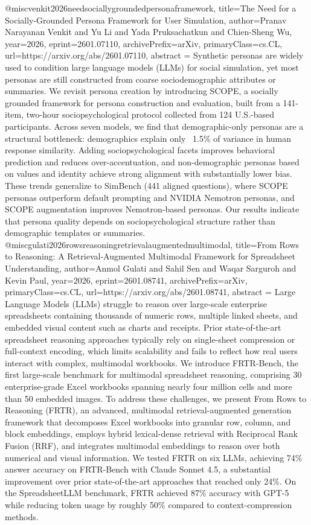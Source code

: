 {}@misc{venkit2026needsociallygroundedpersonaframework,
      title={The Need for a Socially-Grounded Persona Framework for User Simulation}, 
      author={Pranav Narayanan Venkit and Yu Li and Yada Pruksachatkun and Chien-Sheng Wu},
      year={2026},
      eprint={2601.07110},
      archivePrefix={arXiv},
      primaryClass={cs.CL},
      url={https://arxiv.org/abs/2601.07110},
      abstract = {Synthetic personas are widely used to condition large language models (LLMs) for social simulation, yet most personas are still constructed from coarse sociodemographic attributes or summaries. We revisit persona creation by introducing SCOPE, a socially grounded framework for persona construction and evaluation, built from a 141-item, two-hour sociopsychological protocol collected from 124 U.S.-based participants. Across seven models, we find that demographic-only personas are a structural bottleneck: demographics explain only ~1.5\% of variance in human response similarity. Adding sociopsychological facets improves behavioral prediction and reduces over-accentuation, and non-demographic personas based on values and identity achieve strong alignment with substantially lower bias. These trends generalize to SimBench (441 aligned questions), where SCOPE personas outperform default prompting and NVIDIA Nemotron personas, and SCOPE augmentation improves Nemotron-based personas. Our results indicate that persona quality depends on sociopsychological structure rather than demographic templates or summaries.}
}@misc{gulati2026rowsreasoningretrievalaugmentedmultimodal,
      title={From Rows to Reasoning: A Retrieval-Augmented Multimodal Framework for Spreadsheet Understanding}, 
      author={Anmol Gulati and Sahil Sen and Waqar Sarguroh and Kevin Paul},
      year={2026},
      eprint={2601.08741},
      archivePrefix={arXiv},
      primaryClass={cs.CL},
      url={https://arxiv.org/abs/2601.08741},
      abstract = {Large Language Models (LLMs) struggle to reason over large-scale enterprise spreadsheets containing thousands of numeric rows, multiple linked sheets, and embedded visual content such as charts and receipts. Prior state-of-the-art spreadsheet reasoning approaches typically rely on single-sheet compression or full-context encoding, which limits scalability and fails to reflect how real users interact with complex, multimodal workbooks. We introduce FRTR-Bench, the first large-scale benchmark for multimodal spreadsheet reasoning, comprising 30 enterprise-grade Excel workbooks spanning nearly four million cells and more than 50 embedded images. To address these challenges, we present From Rows to Reasoning (FRTR), an advanced, multimodal retrieval-augmented generation framework that decomposes Excel workbooks into granular row, column, and block embeddings, employs hybrid lexical-dense retrieval with Reciprocal Rank Fusion (RRF), and integrates multimodal embeddings to reason over both numerical and visual information. We tested FRTR on six LLMs, achieving 74\% answer accuracy on FRTR-Bench with Claude Sonnet 4.5, a substantial improvement over prior state-of-the-art approaches that reached only 24\%. On the SpreadsheetLLM benchmark, FRTR achieved 87\% accuracy with GPT-5 while reducing token usage by roughly 50\% compared to context-compression methods.}
}
